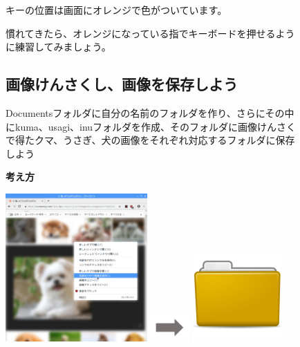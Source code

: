 \documentclass[a4paper,12pt]{jarticle}
\begin{document}
\begin{figure}[t]
{\begin{minipage}{5cm}
      \bigskip

      キーの位置は画面にオレンジで色がついています。


      \bigskip

      慣れてきたら、オレンジになっている指でキーボードを押せるように練習してみましょう。


      \bigskip
    \end{minipage}
  }

  \bigskip
  \bigskip
  \bigskip
  \bigskip
\end{figure}
\clearpage
\begin{figure}[t]
  \subsection{\theExercise
    画像けんさくし、画像を保存しよう}
  Documentsフォルダに自分の名前のフォルダを作り、さらにその中にkuma、usagi、inuフォルダを作成、そのフォルダに画像けんさくで得たクマ、うさぎ、犬の画像をそれぞれ対応するフォルダに保存しよう

  \textbf{考え方}


  \bigskip




  \centering
  \begin{minipage}{\textwidth}
    \begin{minipage}{5.582cm}
      \includegraphics[width=5.413cm]{textbook-img092.png}
    \end{minipage}
    \begin{minipage}{3.582cm}
      \includegraphics[width=1.505cm]{textbook-img073.png}
    \end{minipage}
    \begin{minipage}{5.582cm}
      \includegraphics[width=3.387cm]{textbook-img044.png}
    \end{minipage}
  \end{minipage}



\end{figure}
\end{document}
